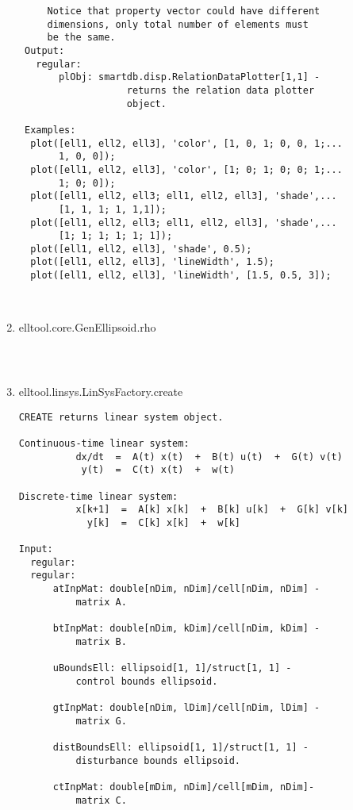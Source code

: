 \begin{enumerate}
\begin{lstlisting}
     Notice that property vector could have different
     dimensions, only total number of elements must
     be the same.
 Output:
   regular:
       plObj: smartdb.disp.RelationDataPlotter[1,1] -
                   returns the relation data plotter
                   object.

 Examples:
  plot([ell1, ell2, ell3], 'color', [1, 0, 1; 0, 0, 1;...
       1, 0, 0]);
  plot([ell1, ell2, ell3], 'color', [1; 0; 1; 0; 0; 1;...
       1; 0; 0]);
  plot([ell1, ell2, ell3; ell1, ell2, ell3], 'shade',...
       [1, 1, 1; 1, 1,1]);
  plot([ell1, ell2, ell3; ell1, ell2, ell3], 'shade',...
       [1; 1; 1; 1; 1; 1]);
  plot([ell1, ell2, ell3], 'shade', 0.5);
  plot([ell1, ell2, ell3], 'lineWidth', 1.5);
  plot([ell1, ell2, ell3], 'lineWidth', [1.5, 0.5, 3]);



\end{lstlisting}
\fontfamily{\familydefault}
\selectfont
\item {elltool.core.GenEllipsoid.rho}
\selectfont
\begin{lstlisting}



\end{lstlisting}
\fontfamily{\familydefault}
\selectfont
\item {elltool.linsys.LinSysFactory.create}
\selectfont
\begin{lstlisting}
CREATE returns linear system object.

Continuous-time linear system:
          dx/dt  =  A(t) x(t)  +  B(t) u(t)  +  G(t) v(t)
           y(t)  =  C(t) x(t)  +  w(t)

Discrete-time linear system:
          x[k+1]  =  A[k] x[k]  +  B[k] u[k]  +  G[k] v[k]
            y[k]  =  C[k] x[k]  +  w[k]

Input:
  regular:
  regular:
      atInpMat: double[nDim, nDim]/cell[nDim, nDim] -
          matrix A.

      btInpMat: double[nDim, kDim]/cell[nDim, kDim] -
          matrix B.

      uBoundsEll: ellipsoid[1, 1]/struct[1, 1] -
          control bounds ellipsoid.

      gtInpMat: double[nDim, lDim]/cell[nDim, lDim] -
          matrix G.

      distBoundsEll: ellipsoid[1, 1]/struct[1, 1] -
          disturbance bounds ellipsoid.

      ctInpMat: double[mDim, nDim]/cell[mDim, nDim]-
          matrix C.


\end{lstlisting}
\end{enumerate}
